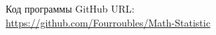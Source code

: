 \documentclass[../main.tex]{subfiles}
\begin{document}
    \noindent Код программы GitHub URL:\\
    \newline \url{https://github.com/Fourroubles/Math-Statistic}
\end{document}
